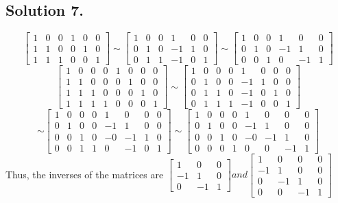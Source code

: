 \documentclass{article}
\begin{document}
\subsection*{Solution 7.}
\[\left[\begin{array}{cccccc}1&0&0&1&0&0\\1&1&0&0&1&0\\1&1&1&0&0&1\end{array}\right]\sim\left[\begin{array}{cccccc}1&0&0&1&0&0\\0&1&0&-1&1&0\\0&1&1&-1&0&1\end{array}\right]\sim\left[\begin{array}{cccccc}1&0&0&1&0&0\\0&1&0&-1&1&0\\0&0&1&0&-1&1\end{array}\right]\]
\[\left[\begin{array}{cccccccc}1&0&0&0&1&0&0&0\\1&1&0&0&0&1&0&0\\1&1&1&0&0&0&1&0\\1&1&1&1&0&0&0&1\end{array}\right]\sim\left[\begin{array}{cccccccc}1&0&0&0&1&0&0&0\\0&1&0&0&-1&1&0&0\\0&1&1&0&-1&0&1&0\\0&1&1&1&-1&0&0&1\end{array}\right]\]
\[\sim\left[\begin{array}{cccccccc}1&0&0&0&1&0&0&0\\0&1&0&0&-1&1&0&0\\0&0&1&0&-0&-1&1&0\\0&0&1&1&0&-1&0&1\end{array}\right]\sim\left[\begin{array}{cccccccc}1&0&0&0&1&0&0&0\\0&1&0&0&-1&1&0&0\\0&0&1&0&-0&-1&1&0\\0&0&0&1&0&0&-1&1\end{array}\right]\]
Thus, the inverses of the matrices are $\left[\begin{array}{ccc}1&0&0\\-1&1&0\\0&-1&1\end{array}\right] and \left[\begin{array}{cccc}1&0&0&0\\-1&1&0&0\\0&-1&1&0\\0&0&-1&1\end{array}\right]$
\end{document}
